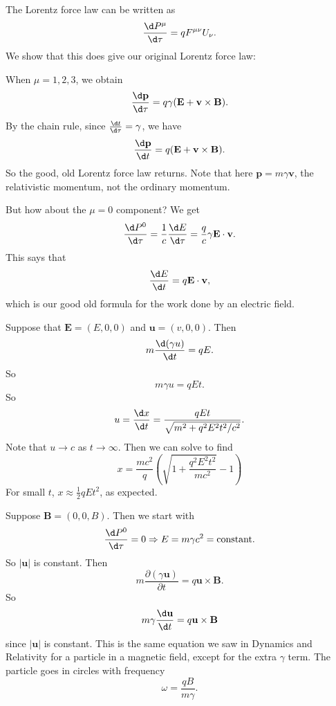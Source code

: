 \documentclass[a4paper]{article}
\begin{document}
The Lorentz force law can be written as
\[
  \frac{\d P^\mu}{\d \tau} = qF^{\mu\nu}U_\nu.
\]
We show that this does give our original Lorentz force law:

When $\mu = 1, 2, 3$, we obtain
\[
  \frac{\d \mathbf{p}}{\d \tau} = q\gamma (\mathbf{E} + \mathbf{v}\times \mathbf{B}).
\]
By the chain rule, since $\frac{\d t}{\d \tau} = \gamma$, we have
\[
  \frac{\d \mathbf{p}}{\d t} = q(\mathbf{E}+ \mathbf{v}\times \mathbf{B}).
\]
So the good, old Lorentz force law returns. Note that here $\mathbf{p} = m\gamma \mathbf{v}$, the relativistic momentum, not the ordinary momentum.

But how about the $\mu = 0$ component? We get
\[
  \frac{\d P^0}{\d \tau} = \frac{1}{c}\frac{\d E}{\d \tau} = \frac{q}{c}\gamma \mathbf{E}\cdot \mathbf{v}.
\]
This says that
\[
  \frac{\d E}{\d t} = q\mathbf{E}\cdot \mathbf{v},
\]
which is our good old formula for the work done by an electric field.

\begin{eg}
  Suppose that $\mathbf{E} = (E, 0, 0)$ and $\mathbf{u} = (v, 0, 0)$. Then
  \[
    m\frac{\d (\gamma u)}{\d t} = qE.
  \]
  So
  \[
    m\gamma u = qEt.
  \]
  So
  \[
    u = \frac{\d x}{\d t} = \frac{qEt}{\sqrt{m^2 + q^2 E^2 t^2/c^2}}.
  \]
  Note that $u\to c$ as $t\to \infty$. Then we can solve to find
  \[
    x = \frac{mc^2}{q}\left(\sqrt{1 + \frac{q^2 E^2 t^2}{mc^2}} - 1\right)
  \]
  For small $t$, $x\approx \frac{1}{2}qEt^2$, as expected.
\end{eg}

\begin{eg}
  Suppose $\mathbf{B} = (0, 0, B)$. Then we start with
  \[
    \frac{\d P^0}{\d \tau} = 0 \Rightarrow E = m\gamma c^2 = \text{constant}.
  \]
  So $|\mathbf{u}|$ is constant. Then
  \[
    m\frac{\partial (\gamma \mathbf{u})}{\partial t} = q\mathbf{u}\times \mathbf{B}.
  \]
  So
  \[
    m\gamma \frac{\d \mathbf{u}}{\d t} = q\mathbf{u}\times \mathbf{B}
  \]
  since $|\mathbf{u}|$ is constant. This is the same equation we saw in Dynamics and Relativity for a particle in a magnetic field, except for the extra $\gamma$ term. The particle goes in circles with frequency
  \[
    \omega = \frac{qB}{m\gamma}.
  \]
\end{eg}
\end{document}
